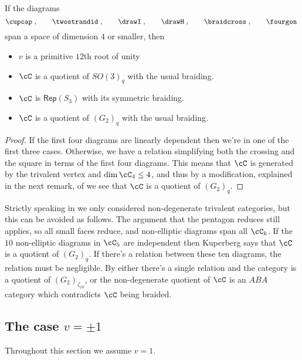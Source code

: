 \documentclass[12pt]{amsart}
\begin{document}
\begin{proposition} \label{prop:dim4}
If the diagrams  
  \[
  \cupcap\;,\qquad\twostrandid\;,
    \qquad\drawI\;,\qquad\drawH\;,\qquad\braidcross\;,\qquad\fourgon\;
   \]
span a space of dimension $4$ or smaller, then
\begin{itemize}
\item $v$ is a primitive $12$th root of unity
\item $\cC$ is a quotient of $SO(3)_q$ with the usual braiding.
\item $\cC$ is $\mathsf{Rep}(S_3)$ with its symmetric braiding.
\item $\cC$ is a quotient of $(G_2)_q$ with the usual braiding.  
\end{itemize}
\end{proposition}
\begin{proof}
If the first four diagrams are linearly dependent then we're in one of the
first three cases.  Otherwise, we have a relation simplifying both the
crossing and the square in terms of the first four diagrams.  This means that
$\cC$ is generated by the trivalent vertex and $\dim \cC_4 \leq 4$, and thus
by a modification, explained in the next remark, of \cite[\S 5]{MR3624901} we see that $\cC$ is a
quotient of $(G_2)_q$.
\end{proof}

\begin{remark}
Strictly speaking in \cite{MR3624901} we only considered non-degenerate trivalent categories, but this can be avoided as follows.  The argument that the pentagon reduces still applies, so all small faces reduce, and non-elliptic diagrams span all $\cC_k$.  If the $10$ non-elliptic diagrams in $\cC_5$ are independent then Kuperberg \cite{MR1265145} says that $\cC$ is a quotient of $(G_2)_q$.  If there's a relation between these ten diagrams, the relation must be negligible.  By \cite{MR3624901} either there's a single relation and the category is a quotient of $(G_2)_{\zeta_{10}}$, or the non-degenerate quotient of $\cC$ is an $ABA$ category which contradicts $\cC$ being braided.
\end{remark}



\subsection{The case \texorpdfstring{$v = \pm 1$}{v = pm 1}}

Throughout this section we assume $v=1$.
\end{document}
